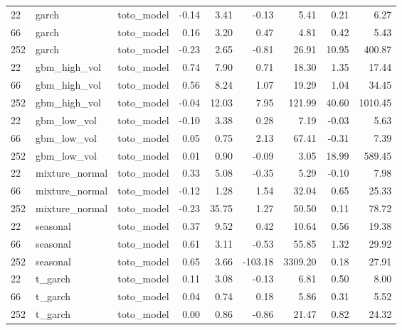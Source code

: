 {\begin{tabular}{lllrrrrrr}
\midrule
22 & garch & toto\_model & -0.14 & 3.41 & -0.13 & 5.41 & 0.21 & 6.27 \\
66 & garch & toto\_model & 0.16 & 3.20 & 0.47 & 4.81 & 0.42 & 5.43 \\
252 & garch & toto\_model & -0.23 & 2.65 & -0.81 & 26.91 & 10.95 & 400.87 \\
\midrule
22 & gbm\_high\_vol & toto\_model & 0.74 & 7.90 & 0.71 & 18.30 & 1.35 & 17.44 \\
66 & gbm\_high\_vol & toto\_model & 0.56 & 8.24 & 1.07 & 19.29 & 1.04 & 34.45 \\
252 & gbm\_high\_vol & toto\_model & -0.04 & 12.03 & 7.95 & 121.99 & 40.60 & 1010.45 \\
\midrule
22 & gbm\_low\_vol & toto\_model & -0.10 & 3.38 & 0.28 & 7.19 & -0.03 & 5.63 \\
66 & gbm\_low\_vol & toto\_model & 0.05 & 0.75 & 2.13 & 67.41 & -0.31 & 7.39 \\
252 & gbm\_low\_vol & toto\_model & 0.01 & 0.90 & -0.09 & 3.05 & 18.99 & 589.45 \\
\midrule
22 & mixture\_normal & toto\_model & 0.33 & 5.08 & -0.35 & 5.29 & -0.10 & 7.98 \\
66 & mixture\_normal & toto\_model & -0.12 & 1.28 & 1.54 & 32.04 & 0.65 & 25.33 \\
252 & mixture\_normal & toto\_model & -0.23 & 35.75 & 1.27 & 50.50 & 0.11 & 78.72 \\
\midrule
22 & seasonal & toto\_model & 0.37 & 9.52 & 0.42 & 10.64 & 0.56 & 19.38 \\
66 & seasonal & toto\_model & 0.61 & 3.11 & -0.53 & 55.85 & 1.32 & 29.92 \\
252 & seasonal & toto\_model & 0.65 & 3.66 & -103.18 & 3309.20 & 0.18 & 27.91 \\
\midrule
22 & t\_garch & toto\_model & 0.11 & 3.08 & -0.13 & 6.81 & 0.50 & 8.00 \\
66 & t\_garch & toto\_model & 0.04 & 0.74 & 0.18 & 5.86 & 0.31 & 5.52 \\
252 & t\_garch & toto\_model & 0.00 & 0.86 & -0.86 & 21.47 & 0.82 & 24.32 \\
\bottomrule
\end{tabular}
}